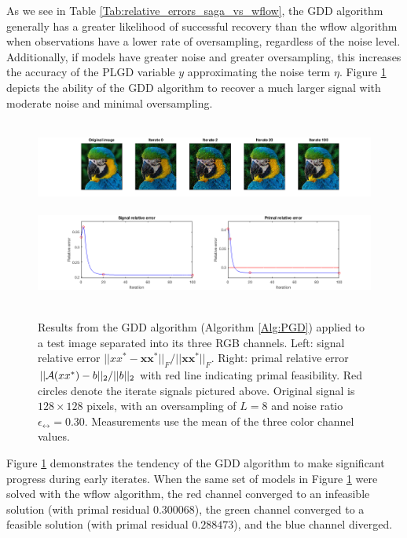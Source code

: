 As we see in Table \ref{Tab:relative_errors_saga_vs_wflow}, the GDD algorithm generally has a greater likelihood of successful recovery than the wflow algorithm when observations have a lower rate of oversampling, regardless of the noise level.  
Additionally, if models have greater noise and greater oversampling, this increases the accuracy of the PLGD variable $y$ approximating the noise term $\eta$.
Figure \ref{Fig:parrot_signal_relative_error_2} depicts the ability of the GDD algorithm to recover a much larger signal with moderate noise and minimal oversampling.

\begin{figure}[H]
\centering
\hbox{\hspace{-1.6cm} \includegraphics[scale=0.55]{parrot_signal_iterates} }
\hbox{\hspace{-1.7cm} \includegraphics[scale=0.6]{parrot_signal_relative_error_2} }
\caption{Results from the GDD algorithm (Algorithm \ref{Alg:PGD}) applied to a test image separated into its three RGB channels.  Left: signal relative error $||xx^*- \mathbf{x}\mathbf{x}^*||_F / ||\mathbf{x}\mathbf{x}^*||_F$.  Right: primal relative error $||{\mathcal A}(xx^*)-b||_2 /  ||b||_2$ with red line indicating primal feasibility.  Red circles denote the iterate signals pictured above.  Original signal is $128 \times 128$ pixels, with an oversampling of $L = 8$ and noise ratio $\epsilon_\rel = 0.30$.  Measurements use the mean of the three color channel values.}
\label{Fig:parrot_signal_relative_error_2}
\end{figure}

Figure \ref{Fig:parrot_signal_relative_error_2} demonstrates the tendency of the GDD algorithm to make significant progress during early iterates.  When the same set of models in Figure \ref{Fig:parrot_signal_relative_error_2} were solved with the wflow algorithm, the red channel converged to an infeasible solution (with primal residual $0.300068$), the green channel converged to a feasible solution (with primal residual $0.288473$), and the blue channel diverged.  





